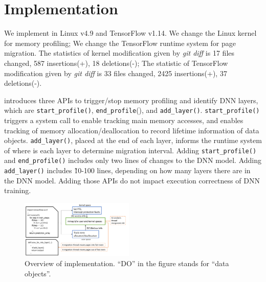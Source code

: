 \section{Implementation}
\label{sec:impl}

We implement \name in Linux v4.9 and TensorFlow v1.14. We change the Linux kernel for memory profiling; We change the TensorFlow runtime system for page migration. The statistics of kernel modification given by \textit{git diff} is 17 files changed, 587 insertions(+), 18 deletions(-); The statistic of TensorFlow modification given by \textit{git diff} is 33 files changed, 2425 insertions(+), 37 deletions(-).

\name introduces three APIs to trigger/stop memory profiling and identify DNN layers, which are \texttt{start\_profile()}, \texttt{end\_profile}(), and \texttt{add\_layer()}. \texttt{start\_profile()} triggers a system call to enable tracking main memory accesses, and enables tracking of memory allocation/deallocation to record lifetime information of data objects. \texttt{add\_layer()}, placed at the end of each layer, informs the runtime system of where is each layer to determine migration interval. Adding \texttt{start\_profile()} and \texttt{end\_profile()} includes only two lines of changes to the DNN model. Adding \texttt{add\_layer()} includes \~10-100 lines, depending on how many layers there are in the DNN model. Adding those APIs do not impact execution correctness of DNN training. 




\begin{figure}
\centering
\includegraphics[width=0.48\textwidth]{figures/impl.pdf}
\vspace{-20pt}
\caption{Overview of \name implementation. ``DO'' in the figure stands for ``data objects''.}
\vspace{-15pt}
\label{fig:impl}
\end{figure}

